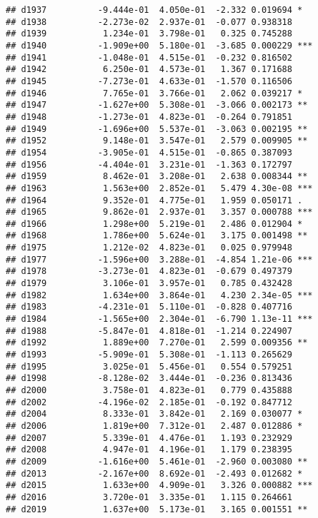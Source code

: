 \documentclass[
]{article}
\begin{document}
\begin{verbatim}
## d1937          -9.444e-01  4.050e-01  -2.332 0.019694 *  
## d1938          -2.273e-02  2.937e-01  -0.077 0.938318    
## d1939           1.234e-01  3.798e-01   0.325 0.745288    
## d1940          -1.909e+00  5.180e-01  -3.685 0.000229 ***
## d1941          -1.048e-01  4.515e-01  -0.232 0.816502    
## d1942           6.250e-01  4.573e-01   1.367 0.171688    
## d1945          -7.273e-01  4.633e-01  -1.570 0.116506    
## d1946           7.765e-01  3.766e-01   2.062 0.039217 *  
## d1947          -1.627e+00  5.308e-01  -3.066 0.002173 ** 
## d1948          -1.273e-01  4.823e-01  -0.264 0.791851    
## d1949          -1.696e+00  5.537e-01  -3.063 0.002195 ** 
## d1952           9.148e-01  3.547e-01   2.579 0.009905 ** 
## d1954          -3.905e-01  4.515e-01  -0.865 0.387093    
## d1956          -4.404e-01  3.231e-01  -1.363 0.172797    
## d1959           8.462e-01  3.208e-01   2.638 0.008344 ** 
## d1963           1.563e+00  2.852e-01   5.479 4.30e-08 ***
## d1964           9.352e-01  4.775e-01   1.959 0.050171 .  
## d1965           9.862e-01  2.937e-01   3.357 0.000788 ***
## d1966           1.298e+00  5.219e-01   2.486 0.012904 *  
## d1968           1.786e+00  5.624e-01   3.175 0.001498 ** 
## d1975           1.212e-02  4.823e-01   0.025 0.979948    
## d1977          -1.596e+00  3.288e-01  -4.854 1.21e-06 ***
## d1978          -3.273e-01  4.823e-01  -0.679 0.497379    
## d1979           3.106e-01  3.957e-01   0.785 0.432428    
## d1982           1.634e+00  3.864e-01   4.230 2.34e-05 ***
## d1983          -4.231e-01  5.110e-01  -0.828 0.407716    
## d1984          -1.565e+00  2.304e-01  -6.790 1.13e-11 ***
## d1988          -5.847e-01  4.818e-01  -1.214 0.224907    
## d1992           1.889e+00  7.270e-01   2.599 0.009356 ** 
## d1993          -5.909e-01  5.308e-01  -1.113 0.265629    
## d1995           3.025e-01  5.456e-01   0.554 0.579251    
## d1998          -8.128e-02  3.444e-01  -0.236 0.813436    
## d2000           3.758e-01  4.823e-01   0.779 0.435888    
## d2002          -4.196e-02  2.185e-01  -0.192 0.847712    
## d2004           8.333e-01  3.842e-01   2.169 0.030077 *  
## d2006           1.819e+00  7.312e-01   2.487 0.012886 *  
## d2007           5.339e-01  4.476e-01   1.193 0.232929    
## d2008           4.947e-01  4.196e-01   1.179 0.238395    
## d2009          -1.616e+00  5.461e-01  -2.960 0.003080 ** 
## d2013          -2.167e+00  8.692e-01  -2.493 0.012682 *  
## d2015           1.633e+00  4.909e-01   3.326 0.000882 ***
## d2016           3.720e-01  3.335e-01   1.115 0.264661    
## d2019           1.637e+00  5.173e-01   3.165 0.001551 ** 

\end{verbatim}
\end{document}
